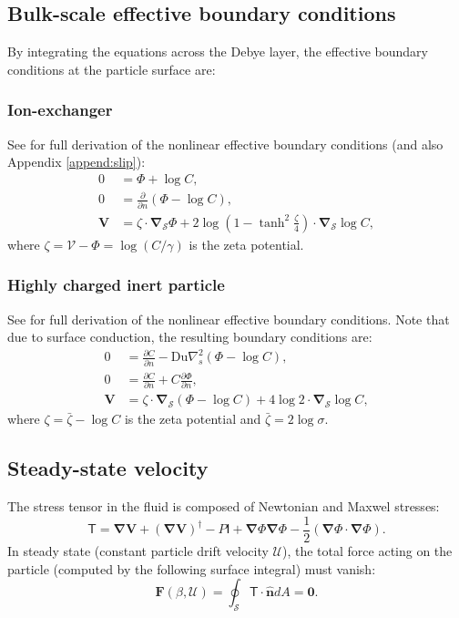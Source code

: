 \documentclass[MSc,beforeExam]{iitcsthesis}
\newcommand{\deriv}[2]{\frac{\partial #1}{\partial #2}}
\newcommand{\pars}[1]{\left(#1\right)}
\newcommand\bnabla{\boldsymbol{\nabla}}
\newcommand\bV{\boldsymbol{V}}
\newcommand\bF{\boldsymbol{F}}
\newcommand\bnhat{\hat{\boldsymbol{n}}}
\newcommand\bzero{\boldsymbol{0}}
\newcommand\Du{\text{Du}}
\newcommand\cU{\mathscr{U}}
\newcommand\cV{\mathscr{V}}
\newcommand\tI{\mathsf{I}}
\newcommand\tT{\mathsf{T}}
\begin{document}
\subsection{Bulk-scale effective boundary conditions}
By integrating the equations across the Debye layer,
the effective boundary conditions at the particle surface are:
\subsubsection{Ion-exchanger} See \cite{yariv2010migration} for full derivation
of the nonlinear effective boundary conditions (and also Appendix \ref{append:slip}):
\begin{align}
\label{eq:ionex_bnd}
\nonumber 
0 &= \varPhi + \log C, \\
0 &= \deriv{}{n} \pars{\varPhi - \log C}, \\
\nonumber \bV &= 
\zeta \cdot \bnabla_\mathcal{S} \varPhi 
+ 2\log\pars{1-\tanh^2\frac{\zeta}{4}} \cdot \bnabla_\mathcal{S} \log C,
\end{align}
where $\zeta = \cV - \varPhi = \log (C / \gamma)$ 
is the zeta potential.

\subsubsection{Highly charged inert particle}
See \cite{schnitzer2012surface} for full derivation
of the nonlinear effective boundary conditions. 
Note that due to surface conduction, the resulting boundary conditions are:
\begin{align} \label{eq:ephor_bnd}
\nonumber
0 &= {\deriv{C}{n} - \Du \nabla^2_s \pars{\varPhi - \log C}}, \\
0 &= {\deriv{C}{n} + C \deriv{\varPhi}{n}}, \\
\nonumber
\bV &= \zeta \cdot \bnabla_\mathcal{S} \pars{\varPhi - \log C} +
4 \log 2 \cdot \bnabla_\mathcal{S} \log C,
\end{align}
where $\zeta = \bar{\zeta} - \log C$ 
is the zeta potential and $\bar{\zeta} = 2 \log \sigma$.

\subsection{Steady-state velocity}
The stress tensor in the fluid is composed of Newtonian and Maxwel stresses:
\begin{equation}
\label{eq:tensor}
\tT = \bnabla \bV + (\bnabla \bV)^\dagger - P \tI
+ \bnabla \varPhi \bnabla \varPhi - \frac{1}{2} (\bnabla \varPhi \cdot \bnabla \varPhi). 
\end{equation} 
In steady state (constant particle drift velocity $\cU$), the total force acting on the particle 
(computed by the following surface integral) must vanish:
\begin{equation} \label{eq:zero_force}
 \bF(\beta, \cU) = \oint_\mathcal{S} \tT \cdot \bnhat dA = \bzero.
\end{equation}
\end{document}
